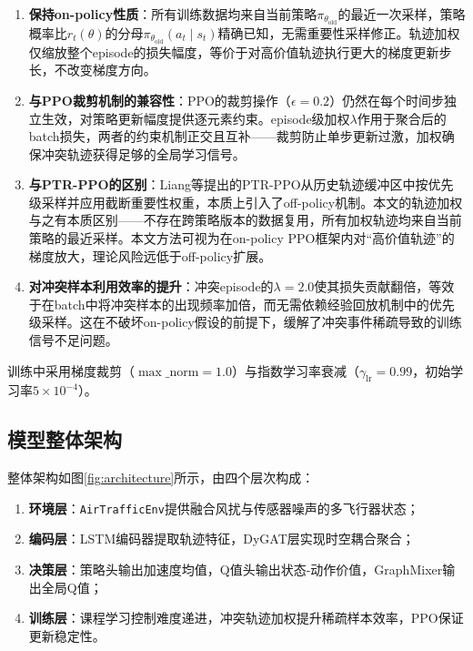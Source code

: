 \documentclass[12pt,a4paper,UTF8]{ctexart}
\begin{document}
\begin{enumerate}[label=(\arabic*)]
    \item \textbf{保持on-policy性质}：所有训练数据均来自当前策略$\pi_{\theta_{\text{old}}}$的最近一次采样，策略概率比$r_t(\theta)$的分母$\pi_{\theta_{\text{old}}}(a_t \mid s_t)$精确已知，无需重要性采样修正。轨迹加权仅缩放整个episode的损失幅度，等价于对高价值轨迹执行更大的梯度更新步长，不改变梯度方向。
    \item \textbf{与PPO裁剪机制的兼容性}：PPO的裁剪操作（$\epsilon=0.2$）仍然在每个时间步独立生效，对策略更新幅度提供逐元素约束。episode级加权$\lambda$作用于聚合后的batch损失，两者的约束机制正交且互补——裁剪防止单步更新过激，加权确保冲突轨迹获得足够的全局学习信号。
    \item \textbf{与PTR-PPO的区别}：Liang等提出的PTR-PPO\cite{ref21}从历史轨迹缓冲区中按优先级采样并应用截断重要性权重，本质上引入了off-policy机制。本文的轨迹加权与之有本质区别——不存在跨策略版本的数据复用，所有加权轨迹均来自当前策略的最近采样。本文方法可视为在on-policy PPO框架内对``高价值轨迹''的梯度放大，理论风险远低于off-policy扩展。
    \item \textbf{对冲突样本利用效率的提升}：冲突episode的$\lambda=2.0$使其损失贡献翻倍，等效于在batch中将冲突样本的出现频率加倍，而无需依赖经验回放机制中的优先级采样。这在不破坏on-policy假设的前提下，缓解了冲突事件稀疏导致的训练信号不足问题。
\end{enumerate}

训练中采用梯度裁剪（$\max\_\text{norm}=1.0$）与指数学习率衰减（$\gamma_{\text{lr}}=0.99$，初始学习率$5 \times 10^{-4}$）。

\subsection{模型整体架构}

整体架构如图\ref{fig:architecture}所示，由四个层次构成：
\begin{enumerate}[label=(\arabic*)]
    \item \textbf{环境层}：\texttt{AirTrafficEnv}提供融合风扰与传感器噪声的多飞行器状态；
    \item \textbf{编码层}：LSTM编码器提取轨迹特征，DyGAT层实现时空耦合聚合；
    \item \textbf{决策层}：策略头输出加速度均值，Q值头输出状态-动作价值，GraphMixer输出全局Q值；
    \item \textbf{训练层}：课程学习控制难度递进，冲突轨迹加权提升稀疏样本效率，PPO保证更新稳定性。
\end{enumerate}
\end{document}
